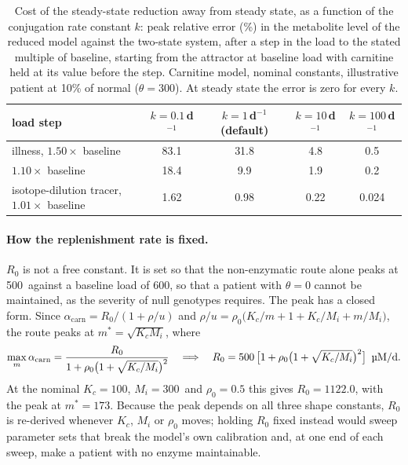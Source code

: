 \begin{table}[tbp]
\centering
\footnotesize
\caption{\label{stab:s1-kcost}Cost of the steady-state reduction away from steady state, as a
function of the conjugation rate constant $k$: peak relative error (\%) in the metabolite
level of the reduced model against the two-state system, after a step in the load to the
stated multiple of baseline, starting from the attractor at baseline load with carnitine
held at its value before the step. Carnitine model, nominal constants, illustrative patient
at 10\% of normal ($\theta=300$\um). At steady state the error is zero for every $k$.}
\begin{tabular}{@{}lcccc@{}}
\toprule
load step & $k=0.1$\,d$^{-1}$ & $k=1$\,d$^{-1}$ (default) & $k=10$\,d$^{-1}$ & $k=100$\,d$^{-1}$ \\
\midrule
illness, $1.50\times$ baseline & 83.1 & 31.8 & 4.8 & 0.5 \\
$1.10\times$ baseline & 18.4 & 9.9 & 1.9 & 0.2 \\
isotope-dilution tracer, $1.01\times$ baseline & 1.62 & 0.98 & 0.22 & 0.024 \\
\bottomrule
\end{tabular}
\end{table}

\paragraph{How the replenishment rate is fixed.} $R_0$ is not a free constant. It is set so
that the non-enzymatic route alone peaks at 500\um\ against a baseline load of 600\um, so
that a patient with $\theta=0$ cannot be maintained, as the severity of null genotypes
requires. The peak has a closed form. Since $\alpha_{\mathrm{carn}}=R_0/(1+\rho/u)$ and
$\rho/u=\rho_0\bigl(K_c/m+1+K_c/M_i+m/M_i\bigr)$, the route peaks at
$m^{\ast}=\sqrt{K_cM_i}$, where
\begin{equation}
\label{seq:s1-R0}
\max_m\alpha_{\mathrm{carn}}=\frac{R_0}{1+\rho_0\bigl(1+\sqrt{K_c/M_i}\bigr)^{2}}
\quad\Longrightarrow\quad
R_0=500\,\bigl[1+\rho_0\bigl(1+\sqrt{K_c/M_i}\bigr)^{2}\bigr]\ \text{\um}.
\end{equation}
At the nominal $K_c=100$\uM, $M_i=300$\uM\ and $\rho_0=0.5$ this gives $R_0=1122.0$\um, with
the peak at $m^{\ast}=173$\uM. Because the peak depends on all three shape constants, $R_0$
is re-derived whenever $K_c$, $M_i$ or $\rho_0$ moves; holding $R_0$ fixed instead would
sweep parameter sets that break the model's own calibration and, at one end of each sweep,
make a patient with no enzyme maintainable.


